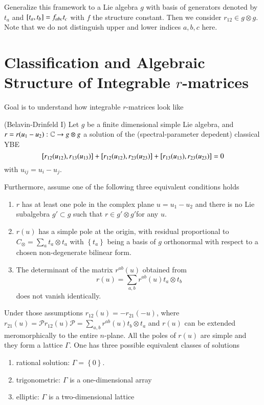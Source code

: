 Generalize this framework to a Lie algebra $g$ with basis of generators denoted by $t_a$ and $\comm{t_a}{t_b} = f_{abc} t_c$ with $f$ the structure constant. Then we consider $r_{12} \in g \otimes g$. Note that we do not distinguish upper and lower indices $a, b, c$ here.

\section{Classification and Algebraic Structure of Integrable $r$-matrices}
Goal is to understand how integrable $r$-matrices look like

\begin{theorem} (Belavin-Drinfeld I)
	Let $g$ be a finite dimensional simple Lie algebra, and $r = r(u_1 - u_2): \mathbb{C} \rightarrow g \otimes g$ a solution of the (spectral-parameter depedent) classical YBE 
	\begin{equation}
		\comm{r_{12}(u_{12})}{r_{13} (u_{13})} + \comm{r_{12}(u_{12})}{r_{23}(u_{23})} + \comm{r_{13}(u_{13})}{r_{23}(u_{23})} = 0
		\label{math:4.5}
	\end{equation}
	with $u_{ij} = u_{i} - u_j$.

	Furthermore, assume one of the following three equivalent conditions holds
	\begin{enumerate}
		\item $r$ has at least one pole in the complex plane $u = u_1 - u_2$ and there is no Lie subalgebra $g' \subset g$ such that $r \in g' \otimes g'$for any $u$.
		\item $r(u)$ has a simple pole at the origin, with residual proportional to $C_{\otimes} = \sum_a t_a \otimes t_a$ with $\left\{ t_a \right\} $ being a basis of $g$ orthonormal with respect to a chosen non-degenerate  bilinear form.
		\item The determinant of the matrix $r^{ab}(u)$ obtained from 
			\begin{equation*}
				r(u) = \sum_{a, b} r^{ab}(u) t_a \otimes t_b
			\end{equation*}
			does not vanish identically.
	\end{enumerate}

	Under those assumptions $r_{12}(u) = - r_{21}(-u)$, where $r_{21}(u) = \mathcal{P} r_{12} (u) \mathcal{P} = \sum_{a, b} r^{ab} (u ) t_b \otimes t_a$ and $r(u)$ can be extended meromorphically to the entire $n$-plane. All the poles of $r(u)$ are simple and they form a lattice $\Gamma$. One has three possible equivalent classes of solutions
	\begin{enumerate}
		\item rational solution: $\Gamma = \left\{ 0 \right\} $.
		\item trigonometric: $\Gamma$ is a one-dimensional array
		\item elliptic: $\Gamma$ is a two-dimensional lattice
	\end{enumerate}
\end{theorem}

